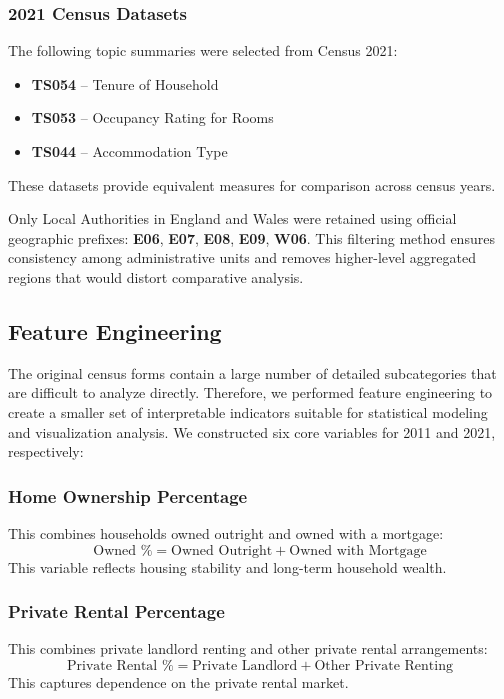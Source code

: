 \documentclass[conference]{IEEEtran}
\begin{document}
\subsubsection{2021 Census Datasets}
The following topic summaries were selected from Census 2021:
\begin{itemize}
    \item \textbf{TS054} -- Tenure of Household
    \item \textbf{TS053} -- Occupancy Rating for Rooms
    \item \textbf{TS044} -- Accommodation Type
\end{itemize}
These datasets provide equivalent measures for comparison across census years.

Only Local Authorities in England and Wales were retained using official geographic prefixes: \textbf{E06}, \textbf{E07}, \textbf{E08}, \textbf{E09}, \textbf{W06}. This filtering method ensures consistency among administrative units and removes higher-level aggregated regions that would distort comparative analysis.

\subsection{Feature Engineering}
The original census forms contain a large number of detailed subcategories that are difficult to analyze directly. Therefore, we performed feature engineering to create a smaller set of interpretable indicators suitable for statistical modeling and visualization analysis. We constructed six core variables for 2011 and 2021, respectively:

\subsubsection{Home Ownership Percentage}
This combines households owned outright and owned with a mortgage:
\begin{equation}
\text{Owned \%} = \text{Owned Outright} + \text{Owned with Mortgage}
\end{equation}
This variable reflects housing stability and long-term household wealth.

\subsubsection{Private Rental Percentage}
This combines private landlord renting and other private rental arrangements:
\begin{equation}
\text{Private Rental \%} = \text{Private Landlord} + \text{Other Private Renting}
\end{equation}
This captures dependence on the private rental market.
\end{document}

